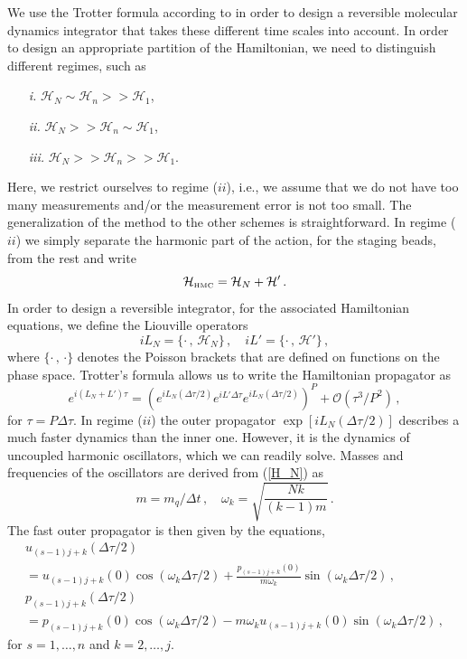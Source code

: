 \documentclass[12pt,a4paper,final]{iopart}
\begin{document}
We use the Trotter formula according to \cite{tuckerman1992reversible} in order to design a reversible molecular dynamics integrator that takes these different time scales into account.
In order to design an appropriate partition of the Hamiltonian, we need to distinguish different regimes, such as
\begin{enumerate}
  \item[\it i.]
  $\mathcal H_N \sim \mathcal H_n >> \mathcal H_1$,
  \item[\it ii.]
  $\mathcal H_N >> \mathcal H_n \sim \mathcal H_1$,
  \item[\it iii.]
  $\mathcal H_N >> \mathcal H_n >> \mathcal H_1$.
\end{enumerate}
Here, we restrict ourselves to regime ($ii$), i.e., we assume that we do not have too many measurements and/or the measurement error is not too small.
The generalization of the method to the other schemes is straightforward.
In regime ($ii$) we simply separate the harmonic part of the action, for the staging beads, from the rest and write
\begin{equation}
  \mathcal{H}_{\mbox{\tiny HMC}}=\mathcal H_N + \mathcal H'\,.
\end{equation}
In order to design a reversible integrator, for the associated Hamiltonian equations, we define the Liouville operators
\begin{equation}
  iL_N=\{\cdot\,,\,\mathcal H_N\}\,,\quad
  iL'=\{\cdot\,,\,\mathcal H'\}\,,
\end{equation}
where $\{\cdot\,,\,\cdot\}$ denotes the Poisson brackets that are defined on functions on the phase space.
Trotter's formula \cite{Trotter_1959_product} allows us to write the Hamiltonian propagator as
\begin{equation}
  e^{i(L_N+L')\tau}
  =
  (e^{iL_N(\Delta\tau/2)}e^{iL'\Delta\tau}e^{iL_N(\Delta\tau/2)})^P
  +
  \mathcal O(\tau^3/P^{2})\,,
\end{equation}
for $\tau =P\Delta \tau$.
In regime ($ii$) the outer propagator $\exp[iL_N(\Delta \tau/2)]$ describes a much faster dynamics than the inner one.
However, it is the dynamics of uncoupled harmonic oscillators, which we can readily solve.
Masses and frequencies of the oscillators are derived from (\ref{H_N}) as
\begin{equation}
  m=m_q/\Delta t\,,\quad
  \omega_k=\sqrt{\frac{Nk}{(k-1)m}}\,.
\end{equation}
The fast outer propagator is then given by the equations,
\begin{eqnarray}
  u_{(s-1)j+k}(\Delta\tau/2) \nonumber \\
  = u_{(s-1)j+k}(0)\cos(\omega_k\Delta\tau/2)
  +
  \frac{p_{(s-1)j+k}(0)}{m\omega_k}\sin(\omega_k\Delta\tau/2)\,,\\
  p_{(s-1)j+k}(\Delta\tau/2) \nonumber \\
  = p_{(s-1)j+k}(0)\cos(\omega_k\Delta\tau/2)
  -
  m\omega_k u_{(s-1)j+k}(0) \sin(\omega_k\Delta\tau/2)\,,
\end{eqnarray}
for $s=1,\dots,n$ and $k=2,\dots,j$.
\end{document}
